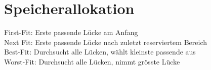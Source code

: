 \section{Speicherallokation}
\textcolor{myblue}{First-Fit}: Erste passende Lücke am Anfang\\
\textcolor{myblue}{Next Fit}: Erste passende Lücke nach zuletzt reserviertem Bereich\\
\textcolor{myblue}{Best-Fit}: Durchsucht alle Lücken, wählt kleinste passende aus\\
\textcolor{myblue}{Worst-Fit}: Durchsucht alle Lücken, nimmt grösste Lücke\\